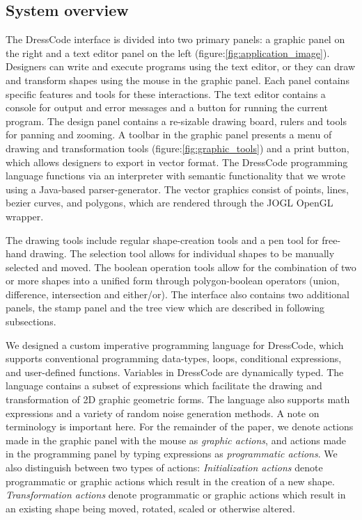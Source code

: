 \documentclass{sigchi}
\begin{document}
\subsection{System overview}
The DressCode interface is divided into two primary panels: a graphic panel on the right and a text editor panel on the left (figure:\ref{fig:application_image}). Designers can write and execute programs using the text editor, or they can draw and transform shapes using the mouse in the graphic panel. Each panel contains specific features and tools for these interactions. The text editor contains a console for output and error messages and a button for running the current program. The design panel contains a re-sizable drawing board, rulers and tools for panning and zooming. A toolbar in the graphic panel presents a menu of drawing and transformation tools (figure:\ref{fig:graphic_tools}) and a print button, which allows designers to export in vector format. The DressCode programming language functions via an interpreter with semantic functionality that we wrote using a Java-based parser-generator. The vector graphics consist of points, lines, bezier curves, and polygons, which are rendered through the JOGL OpenGL wrapper.

The drawing tools include regular shape-creation tools and a pen tool for free-hand drawing. The selection tool allows for individual shapes to be manually selected and moved. The boolean operation tools allow for the combination of two or more shapes into a unified form through polygon-boolean operators (union, difference, intersection and either/or). The interface also contains two additional panels, the stamp panel and the tree view which are described in following subsections.

We designed a custom imperative programming language for DressCode, which supports conventional programming data-types, loops, conditional expressions, and user-defined functions. Variables in DressCode are dynamically typed. The language contains a subset of expressions which facilitate the drawing and transformation of 2D graphic geometric forms. The language also supports math expressions and a variety of random noise generation methods. A note on terminology is important here. For the remainder of the paper, we denote actions made in the graphic panel with the mouse as \textit{graphic actions}, and actions made in the programming panel by typing expressions as \textit{programmatic actions}. We also distinguish between two types of actions: \textit{Initialization actions} denote programmatic or graphic actions which result in the creation of a new shape. \textit{Transformation actions} denote programmatic or graphic actions which result in an existing shape being moved, rotated, scaled or otherwise altered.
\end{document}

